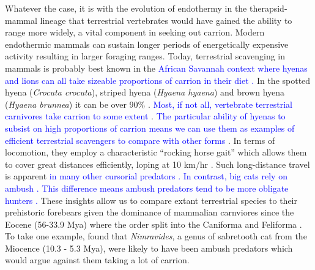 \documentclass[a4paper,12pt]{article}
\begin{document}
Whatever the case, it is with the evolution of endothermy in the therapsid-mammal lineage \citep{clarke2010temperature} that terrestrial vertebrates would have gained the ability to range more widely, a vital component in seeking out carrion.
Modern endothermic mammals can sustain longer periods of energetically expensive activity \citep{bennett1979endothermy} resulting in larger foraging ranges. 
Today, terrestrial scavenging in mammals is probably best known in the \textcolor{blue}{African Savannah context where hyenas and lions can all take sizeable proportions of carrion in their diet \citep{pereira2014facultative,periquet2015lion}.}
In the spotted hyena (\textit{Crocuta crocuta}), striped hyena (\textit{Hyaena hyaena}) and brown hyena (\textit{Hyaena brunnea}) it can be over 90\% \citep{jones2015african}.
\textcolor{blue}{Most, if not all, vertebrate terrestrial carnivores take carrion to some extent \citep{devault2003scavenging,beasley2015vertebrates,pereira2014facultative}}.
\textcolor{blue}{The particular ability of hyenas to subsist on high proportions of carrion means we can use them as examples of efficient terrestrial scavengers to compare with other forms \citep{periquet2015lion}}. 
In terms of locomotion, they employ a characteristic ``rocking horse gait''  which allows them to cover great distances efficiently, loping at 10 km/hr \citep{mills1989comparative,jones2015african}. 
Such long-distance travel is apparent \textcolor{blue}{in many other cursorial predators \citep{pennycuick1995radius,janis2014forelimb,pereira2014facultative}. 
In contrast, big cats rely on ambush \citep{pennycuick1995radius,pereira2014facultative}. 
This difference means ambush predators tend to be more obligate hunters \citep{pereira2014facultative}.} 
These insights allow us to compare extant terrestrial species to their prehistoric forebears given the dominance of mammalian carnviores since the Eocene (56-33.9 Mya) where the order split into the Caniforma and Feliforma \citep{van1987skeletal}.
To take one example, \cite{anyonge1996locomotor} found that \textit{Nimravides}, a genus of sabretooth cat from the Miocence (10.3 - 5.3 Mya), were likely to have been ambush predators which would argue against them taking a lot of carrion. 
\end{document}

